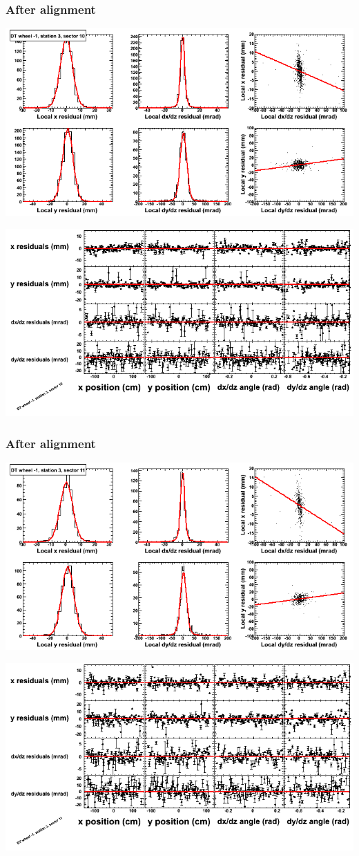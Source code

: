 \documentclass[compress]{beamer}
\begin{document}
\begin{frame}
\frametitle{After alignment}
\includegraphics[width=0.7\linewidth]{NOV4_fitfunctions/MBwhBst3sec10_bellcurves.png}

\includegraphics[width=0.7\linewidth]{NOV4_fitfunctions/MBwhBst3sec10_polynomials.png}
\end{frame}

\begin{frame}
\frametitle{After alignment}
\includegraphics[width=0.7\linewidth]{NOV4_fitfunctions/MBwhBst3sec11_bellcurves.png}

\includegraphics[width=0.7\linewidth]{NOV4_fitfunctions/MBwhBst3sec11_polynomials.png}
\end{frame}
\end{document}
